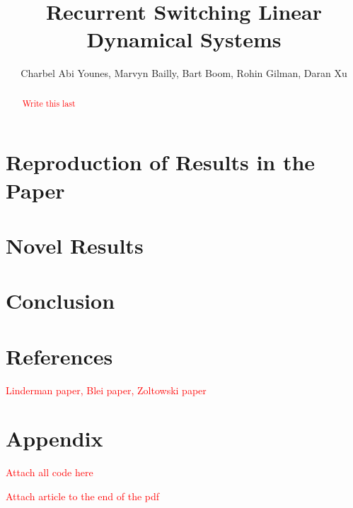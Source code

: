 \documentclass{amsart}
\title{Recurrent Switching Linear Dynamical Systems}
\author{Charbel Abi Younes, Marvyn Bailly, Bart Boom, Rohin Gilman, Daran Xu}
\date{}
\begin{document}
\begin{abstract}
	\textcolor{red}{Write this last}
\end{abstract}

\maketitle



\section{Reproduction of Results in the Paper}

\section{Novel Results}

\section{Conclusion}

\section{References}

\textcolor{red}{Linderman paper, Blei paper, Zoltowski paper}

\section{Appendix}

\textcolor{red}{Attach all code here}

\textcolor{red}{Attach article to the end of the pdf}
\end{document}
